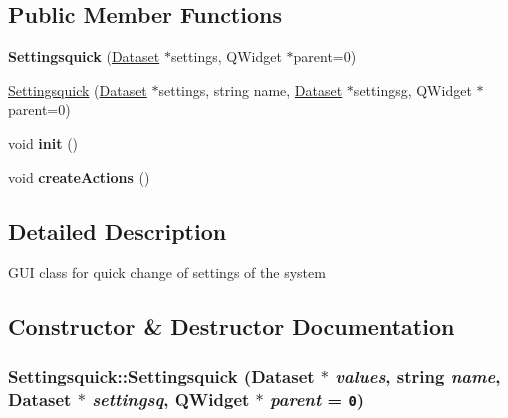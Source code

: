 \subsection*{Public Member Functions}
\begin{CompactItemize}
\item 
\hypertarget{class_settingsquick_07470fba88f284a57c4fbdc728d2c8f3}{
\textbf{Settingsquick} (\hyperlink{class_dataset}{Dataset} $\ast$settings, QWidget $\ast$parent=0)}
\label{class_settingsquick_07470fba88f284a57c4fbdc728d2c8f3}

\item 
\hyperlink{class_settingsquick_ab93782ac074a7e209f1cb602d61c02c}{Settingsquick} (\hyperlink{class_dataset}{Dataset} $\ast$settings, string name, \hyperlink{class_dataset}{Dataset} $\ast$settingsg, QWidget $\ast$parent=0)
\item 
\hypertarget{class_settingsquick_2ec7112d31f52b902061fee31f57f79f}{
void \textbf{init} ()}
\label{class_settingsquick_2ec7112d31f52b902061fee31f57f79f}

\item 
\hypertarget{class_settingsquick_a7c0f1d884fe500df8d9562f89b8f597}{
void \textbf{createActions} ()}
\label{class_settingsquick_a7c0f1d884fe500df8d9562f89b8f597}

\end{CompactItemize}


\subsection{Detailed Description}
GUI class for quick change of settings of the system 

\subsection{Constructor \& Destructor Documentation}
\hypertarget{class_settingsquick_ab93782ac074a7e209f1cb602d61c02c}{
\subsubsection[{Settingsquick}]{\setlength{\rightskip}{0pt plus 5cm}Settingsquick::Settingsquick ({\bf Dataset} $\ast$ {\em values}, \/  string {\em name}, \/  {\bf Dataset} $\ast$ {\em settingsq}, \/  QWidget $\ast$ {\em parent} = {\tt 0})}}
\label{class_settingsquick_ab93782ac074a7e209f1cb602d61c02c}


